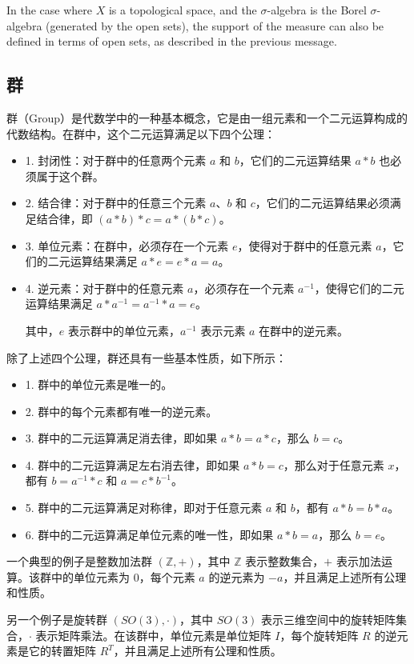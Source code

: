\documentclass[UTF8,a4paper,11pt]{article}
\begin{document}
In the case where $X$ is a topological space, and the $\sigma$-algebra is the Borel $\sigma$-algebra (generated by the open sets), the support of the measure can also be defined in terms of open sets, as described in the previous message.

\subsection{群}
群（Group）是代数学中的一种基本概念，它是由一组元素和一个二元运算构成的代数结构。在群中，这个二元运算满足以下四个公理：
\begin{itemize}
\item 1. 封闭性：对于群中的任意两个元素 $a$ 和 $b$，它们的二元运算结果 $a * b$ 也必须属于这个群。
\item 2. 结合律：对于群中的任意三个元素 $a$、$b$ 和 $c$，它们的二元运算结果必须满足结合律，即 $(a * b) * c = a * (b * c)$。
\item 3. 单位元素：在群中，必须存在一个元素 $e$，使得对于群中的任意元素 $a$，它们的二元运算结果满足 $a * e = e * a = a$。
\item 4. 逆元素：对于群中的任意元素 $a$，必须存在一个元素 $a^{-1}$，使得它们的二元运算结果满足 $a * a^{-1} = a^{-1} * a = e$。

其中，$e$ 表示群中的单位元素，$a^{-1}$ 表示元素 $a$ 在群中的逆元素。
\end{itemize}
除了上述四个公理，群还具有一些基本性质，如下所示：
\begin{itemize}
\item 1. 群中的单位元素是唯一的。
\item 2. 群中的每个元素都有唯一的逆元素。
\item 3. 群中的二元运算满足消去律，即如果 $a * b = a * c$，那么 $b = c$。
\item 4. 群中的二元运算满足左右消去律，即如果 $a * b = c$，那么对于任意元素 $x$，都有 $b = a^{-1} * c$ 和 $a = c * b^{-1}$。
\item 5. 群中的二元运算满足对称律，即对于任意元素 $a$ 和 $b$，都有 $a * b = b * a$。
\item 6. 群中的二元运算满足单位元素的唯一性，即如果 $a * b = a$，那么 $b = e$。
\end{itemize}
一个典型的例子是整数加法群 $(\mathbb{Z}, +)$，其中 $\mathbb{Z}$ 表示整数集合，$+$ 表示加法运算。该群中的单位元素为 0，每个元素 $a$ 的逆元素为 $-a$，并且满足上述所有公理和性质。

另一个例子是旋转群 $(SO(3), \cdot)$，其中 $SO(3)$ 表示三维空间中的旋转矩阵集合，$\cdot$ 表示矩阵乘法。在该群中，单位元素是单位矩阵 $I$，每个旋转矩阵 $R$ 的逆元素是它的转置矩阵 $R^T$，并且满足上述所有公理和性质。
\end{document}
